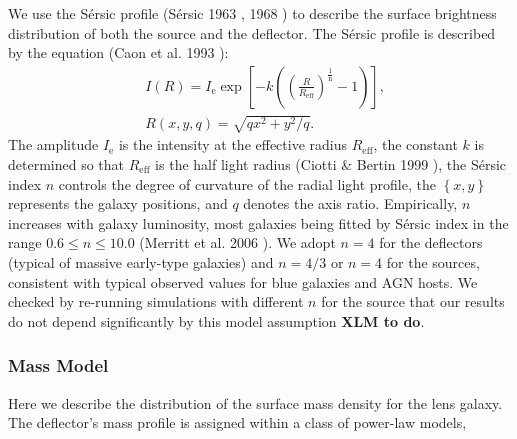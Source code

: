\documentclass[a4paper,11pt]{article}
\begin{document}
We use the S\'ersic profile (S{\'e}rsic 1963 \cite{1963BAAA....6...41S}, 1968 \cite{1968adga.book.....S}) 
to describe the surface
brightness distribution of both the source and the deflector. The
S\'ersic profile is described by the equation (Caon et al. 1993 \cite{1993MNRAS.265.1013C}):
%
\begin{eqnarray}
   \label{eq:Intensity}
   &I(R) = I_{\mathrm{e}} \exp\left[-k\left(\left(\frac{R}{R_{\mathrm{eff}}}\right)^{\frac{1}{\mathrm{n}}}-1\right)\right] ,\\
   &R(x,y,q) = \sqrt{qx^2+y^2/q}.
\end{eqnarray}
%
The amplitude $I_{\mathrm{e}}$ is the intensity at the effective
radius $R_{\mathrm{eff}}$, the constant $k$ is determined so that
$R_{\mathrm{eff}}$ is the half light radius (Ciotti \& Bertin 1999 \cite{1999A&A...352..447C}), the S\'ersic index $n$ controls the degree
of curvature of the radial light profile, the $\left\{x,y\right\}$
represents the galaxy positions, and $q$ denotes the axis
ratio. Empirically, $n$ increases with galaxy luminosity, most
galaxies being fitted by S\'ersic index in the range $0.6 \le n
\le 10.0$ (Merritt et al. 2006 \cite{2006AJ....132.2685M}). We adopt $n=4$ for the
deflectors (typical of massive early-type galaxies) and $n=4/3$ or
$n=4$ for the sources, consistent with typical observed values for
blue galaxies and AGN hosts. We checked by re-running simulations with
different $n$ for the source that our results do not depend
significantly by this model assumption {\bf XLM to do}.

\subsubsection{Mass Model}

Here we describe the distribution of the surface mass density for the
lens galaxy. The deflector's mass profile is assigned within a class
of power-law models,
\end{document}

